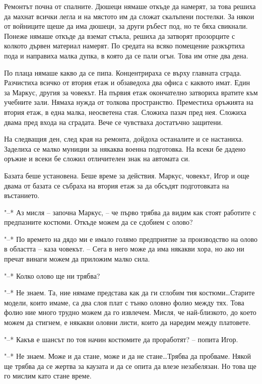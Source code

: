 \documentclass[ebook,openany,12pt]{memoir}
\begin{document}
Ремонтът почна от спалните. Дюшеци нямаше откъде да намерят, за това решиха да махнат всички легла и на мястото им да сложат скалъпени постелки. За някои от войниците щеше да има дюшеци, за други ръбест под, но те бяха свикнали. Понеже нямаше откъде да вземат стъкла, решиха да затворят прозорците с колкото дървен материал намерят. По средата на всяко помещение разкъртиха пода и направиха малка дупка, в която да се пали огън. Това им отне два дена.

По плаца нямаше какво да се пипа. Концентрираха се върху главната сграда. Разчистиха всичко от втория етаж и обзаведоха два офиса с каквото имат. Един за Маркус, другия за човекът. На първия етаж окончателно затвориха вратите към учебните зали. Нямаха нужда от толкова пространство. Преместиха оръжията на втория етаж, в една малка, неосветена стая. Сложиха пазач пред нея. Сложиха двама пред входа на сградата. Вече се чувстваха достатъчно защитени.

На следващия ден, след края на ремонта, дойдоха останалите и се настаниха. Заделиха се малко муниции за някаква военна подготовка. На всеки бе дадено оръжие и всеки бе сложил отличителен знак на автомата си.

Базата беше установена. Беше време за действия. Маркус, човекът, Игор и още двама от базата се събраха на втория етаж за да обсъдят подготовката на въстанието.

"--* Аз мисля – започна Маркус, – че първо трябва да видим как стоят работите с предпазните костюми. Откъде можем да се сдобием с олово?

"--* По времето на дядо ми е имало голямо предприятие за производство на олово в областта – каза човекът. – Сега в него може да има някакви хора, но ако ни пречат винаги можем да приложим малко сила.

"--* Колко олово ще ни трябва?

"--* Не знаем. Та, ние нямаме представа как да ги сглобим тия костюми\ldots Старите модели, които имаме, са два слоя плат с тънко оловно фолио между тях. Това фолио ние много трудно можем да го извлечем. Мисля, че най-близкото, до което можем да стигнем, е някакви оловни листи, които да наредим между платовете.

"--* Какъв е шансът по тоя начин костюмите да проработят? – попита Игор.

"--* Не знаем. Може и да стане, може и да не стане\ldots Трябва да пробваме. Някой ще трябва да се жертва за каузата и да се опита да влезе незабелязан. Но това ще го мислим като стане време.
\end{document}
